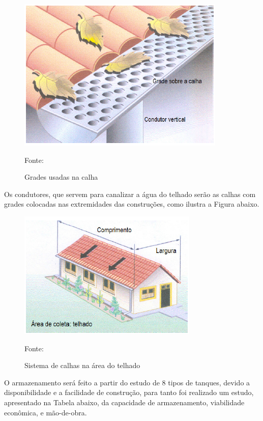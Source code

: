 \begin{figure}[h!]
	\centering
	\label{Grades usadas na calha}
		\includegraphics[keepaspectratio=true,scale=0.9]{figuras/GradesUsadasNaCalha.png}
	\caption{Grades usadas na calha}
	\small{Fonte: \cite{WATERFALL}}
\end{figure}

Os condutores, que servem para canalizar a \'agua do telhado ser\~ao as calhas com grades colocadas nas extremidades das constru\c{c}\~oes, como ilustra a Figura abaixo.

\begin{figure}[h!]
	\centering
	\label{Sistema de calhas na \'area do telhado}
		\includegraphics[keepaspectratio=true,scale=1.2]{figuras/SistemaDeCalhasNaAreaDoTelhado.png}
	\caption{Sistema de calhas na \'area do telhado}
	\small{Fonte:  \cite{WATERFALL}}
\end{figure}

O armazenamento ser\'a feito a partir do estudo de 8 tipos de tanques, devido a disponibilidade e a facilidade de constru\c{c}\~ao, para tanto foi realizado um estudo, apresentado na Tabela abaixo, da capacidade de armazenamento, viabilidade econ\^omica, e m\~ao-de-obra.

